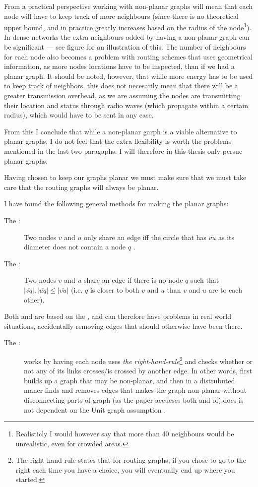 From a practical perspective working with non-planar graphs will mean that each node will have to keep track of more neighbours (since there is no theoretical upper bound, and in practice greatly increases based on the radius of the node\footnote{Realisticly I would however say that more than 40 neighbours would be unrealistic, even for crowded areas.}). In dense networks the extra neighbours added by having a non-planar graph can be significant --- see figure  for an illustration of this. The number of neighbours for each node also becomes a problem with routing schemes that uses geometrical information, as more nodes locations have to be inspected, than if we had a planar graph. It should be noted, however, that while more energy has to be used to keep track of neighbors, this does not necesarily mean that there will be a greater transmission overhead, as we are assuming the nodes are transmitting their location and status through radio waves (which propagate within a certain radius), which would have to be sent in any case.

From this I conclude that while a non-planar garph is a viable alternative to planar graphs, I do not feel that the extra flexibility is worth the problems mentioned in the last two paragaphs. I will therefore in this thesis only persue planar graphs.
 
Having chosen to keep our graphs planar we must make sure that we must take care that the routing graphs will always be planar.

I have found the following general methods for making the planar graphs:
\begin{description}
\item[The \gabe:] Two nodes $v$ and $u$ only share an edge iff the circle that has $\overline{vu}$ as its diameter does not contain a node $q$ \cite{gopher, gpsr}. 
\item[The \rng:] Two nodes $v$ and $u$ share an edge if there is no node $q$ such that $|\overline{vq}|, |\overline{uq}| \leq |\overline{vu}|$ (i.e. $q$ is closer to both $v$ and $u$ than $v$ and $u$ are to each other). \cite{gpsr, RNG}
\end{description}

Both \gabe and \rng are based on the \uga, and can therefore have problems in real world situations, accidentally removing edges that should otherwise have been there\cite{practical}.
\label{right-hand rule}
\begin{description}
\item[The \cldp:] \cldp works by having each node uses \emph{the right-hand-rule}\footnote{The right-hand-rule states that for routing graphs, if you chose to go to the right each time you have a choice, you will eventually end up where you started.} and checks whether or not any of its links crosses/is crossed by another edge. In other words, \cldp first builds up a graph that may be non-planar, and then in a distrubuted maner finds and removes edges that makes the graph non-planar without disconnecting parts of graph (as the paper accueses both \gabe and \rng of).\cldp does is not dependent on the Unit graph assumption \cite{practical}. 
\end{description}

